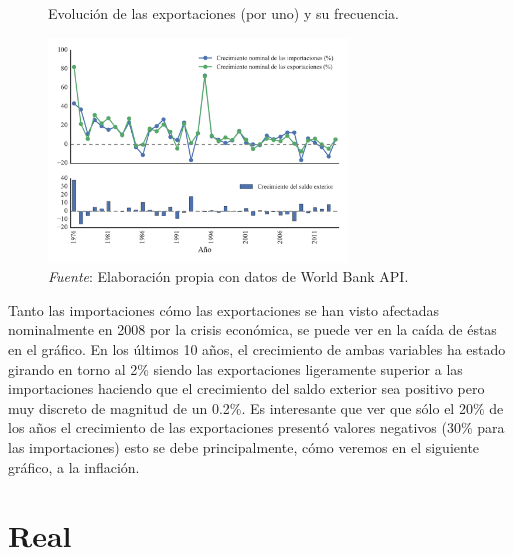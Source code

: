 \documentclass[a4paper,openright,12pt]{book}
\begin{document}
\begin{figure}[htb]
    \caption{Evolución de las exportaciones (por uno) y su frecuencia.}
    \centering
    \includegraphics[width=300px]{ev_nominal.pdf}
    \caption*{\textit{Fuente}: Elaboración propia con datos de World Bank API.}
    \label{ev_nominal}
\end{figure}

Tanto las importaciones cómo las exportaciones se han visto afectadas nominalmente en 2008 por la crisis económica, se puede ver en la caída de éstas en el gráfico. En los últimos 10 años, el crecimiento de ambas variables ha estado girando en torno al 2\% siendo las exportaciones ligeramente superior a las importaciones haciendo que el crecimiento del saldo exterior sea positivo pero muy discreto de magnitud de un 0.2\%. Es interesante que ver que sólo el 20\% de los años el crecimiento de las exportaciones presentó valores negativos (30\% para las importaciones) esto se debe principalmente, cómo veremos en el siguiente gráfico, a la inflación.


\section{Real}
\end{document}
